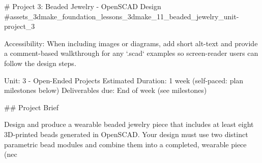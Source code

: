 # Project 3: Beaded Jewelry - OpenSCAD Design {#assets_3dmake_foundation_lessons_3dmake_11_beaded_jewelry_unit-project_3}

Accessibility: When including images or diagrams, add short alt-text and provide a comment-based walkthrough for any `.scad` examples so screen-reader users can follow the design steps.

Unit: 3 - Open-Ended Projects
Estimated Duration: 1 week (self-paced: plan milestones below)
Deliverables due: End of week (see milestones)

## Project Brief

Design and produce a wearable beaded jewelry piece that includes at least eight 3D-printed beads generated in OpenSCAD. Your design must use two distinct parametric bead modules and combine them into a completed, wearable piece (nec